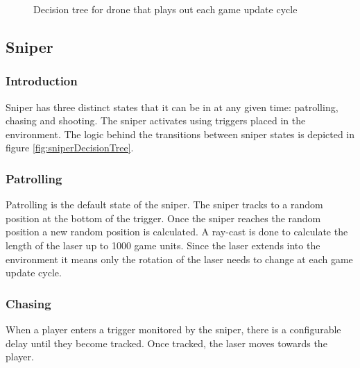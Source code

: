 \documentclass[11pt,a4paper]{article}
\begin{document}
\begin{figure}[H]
    \caption{Decision tree for drone that plays out each game update cycle}
    \label{fig:droneDesisionTree}
\end{figure}
\subsection{Sniper}
\subsubsection{Introduction}
Sniper has three distinct states that it can be in at any given time: patrolling, chasing and shooting. The sniper activates using triggers placed in the environment. The logic behind the transitions between sniper states is depicted in figure \ref{fig:sniperDecisionTree}.
\subsubsection{Patrolling}
Patrolling is the default state of the sniper. The sniper tracks to a random position at the bottom of the trigger. Once the sniper reaches the random position a new random position is calculated. A ray-cast is done to calculate the length of the laser up to 1000 game units. Since the laser extends into the environment it means only the rotation of the laser needs to change at each game update cycle.
\subsubsection{Chasing}
When a player enters a trigger monitored by the sniper, there is a configurable delay until they become tracked. Once tracked, the laser moves towards the player.
\end{document}

